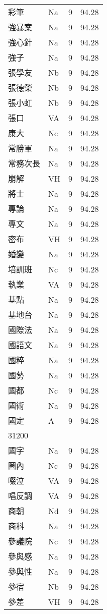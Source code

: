 \documentclass[twocolumn]{book}
\begin{document}
\begin{supertabular}{llrr}
彩筆 & Na & 9 &  94.28\\
強暴案 & Na & 9 &  94.28\\
強心針 & Na & 9 &  94.28\\
強子 & Na & 9 &  94.28\\
張學友 & Nb & 9 &  94.28\\
張德榮 & Nb & 9 &  94.28\\
張小虹 & Nb & 9 &  94.28\\
張口 & VA & 9 &  94.28\\
康大 & Nc & 9 &  94.28\\
常勝軍 & Na & 9 &  94.28\\
常務次長 & Na & 9 &  94.28\\
崩解 & VH & 9 &  94.28\\
將士 & Na & 9 &  94.28\\
專論 & Na & 9 &  94.28\\
專文 & Na & 9 &  94.28\\
密布 & VH & 9 &  94.28\\
婚變 & Na & 9 &  94.28\\
培訓班 & Nc & 9 &  94.28\\
執業 & VA & 9 &  94.28\\
基點 & Na & 9 &  94.28\\
基地台 & Na & 9 &  94.28\\
國際法 & Na & 9 &  94.28\\
國語文 & Na & 9 &  94.28\\
國粹 & Na & 9 &  94.28\\
國勢 & Na & 9 &  94.28\\
國都 & Nc & 9 &  94.28\\
國術 & Na & 9 &  94.28\\
國定 & A & 9 &  94.28\\
31200\\
國字 & Na & 9 &  94.28\\
圈內 & Nc & 9 &  94.28\\
啜泣 & VA & 9 &  94.28\\
唱反調 & VA & 9 &  94.28\\
商朝 & Nd & 9 &  94.28\\
商科 & Na & 9 &  94.28\\
參議院 & Nc & 9 &  94.28\\
參與感 & Na & 9 &  94.28\\
參與性 & Na & 9 &  94.28\\
參宿 & Nb & 9 &  94.28\\
參差 & VH & 9 &  94.28\\

\end{supertabular}
\end{document}
